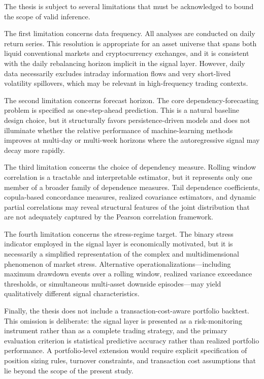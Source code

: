 The thesis is subject to several limitations that must be acknowledged to bound the scope of valid inference.

The first limitation concerns data frequency. All analyses are conducted on daily return series. This resolution is appropriate for an asset universe that spans both liquid conventional markets and cryptocurrency exchanges, and it is consistent with the daily rebalancing horizon implicit in the signal layer. However, daily data necessarily excludes intraday information flows and very short-lived volatility spillovers, which may be relevant in high-frequency trading contexts.

The second limitation concerns forecast horizon. The core dependency-forecasting problem is specified as one-step-ahead prediction. This is a natural baseline design choice, but it structurally favors persistence-driven models and does not illuminate whether the relative performance of machine-learning methods improves at multi-day or multi-week horizons where the autoregressive signal may decay more rapidly.

The third limitation concerns the choice of dependency measure. Rolling window correlation is a tractable and interpretable estimator, but it represents only one member of a broader family of dependence measures. Tail dependence coefficients, copula-based concordance measures, realized covariance estimators, and dynamic partial correlations may reveal structural features of the joint distribution that are not adequately captured by the Pearson correlation framework.

The fourth limitation concerns the stress-regime target. The binary stress indicator employed in the signal layer is economically motivated, but it is necessarily a simplified representation of the complex and multidimensional phenomenon of market stress. Alternative operationalizations---including maximum drawdown events over a rolling window, realized variance exceedance thresholds, or simultaneous multi-asset downside episodes---may yield qualitatively different signal characteristics.

Finally, the thesis does not include a transaction-cost-aware portfolio backtest. This omission is deliberate: the signal layer is presented as a risk-monitoring instrument rather than as a complete trading strategy, and the primary evaluation criterion is statistical predictive accuracy rather than realized portfolio performance. A portfolio-level extension would require explicit specification of position sizing rules, turnover constraints, and transaction cost assumptions that lie beyond the scope of the present study.

